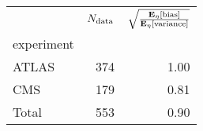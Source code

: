 \begin{center}
    \begin{tabular}{lrr}
        \toprule
        {} &  $N_{\rm data}$ &  $\sqrt{\frac{\mathbf{E}_{\eta}\left[ {\rm bias} \right]}{\mathbf{E}_{\eta}\left[ {\rm variance} \right]}}$ \\
        experiment &        &                      \\
        \midrule
        ATLAS      &    374 &                 1.00 \\
        CMS        &    179 &                 0.81 \\
        Total      &    553 &                 0.90 \\
        \bottomrule
        \end{tabular}
\end{center}
